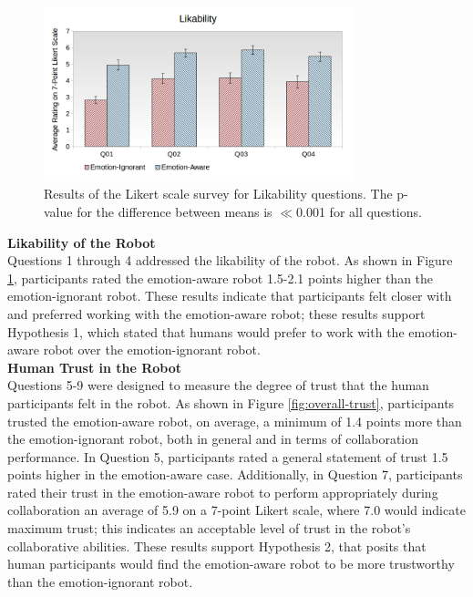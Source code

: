 \documentclass[12pt]{report}
\begin{document}
\begin{figure}[ht]
 \centering
 \includegraphics[width=0.8\textwidth]{figure/Overall-Likability.png}
 \vspace*{-5mm}
 \caption{Results of the Likert scale survey for Likability questions. The
 p-value for the difference between means is $\ll$0.001 for all questions.}
 \label{fig:overall-likability}
\end{figure}

\hspace*{-8mm} \textbf{Likability of the Robot}
\label{sec:Likability}
\\Questions 1 through 4 addressed the likability of the robot. As shown in
Figure \ref{fig:overall-likability}, participants rated the emotion-aware robot
1.5-2.1 points higher than the emotion-ignorant robot. These results
indicate that participants felt closer with and preferred working with the
emotion-aware robot; these results support Hypothesis 1, which stated that
humans would prefer to work with the emotion-aware robot over the
emotion-ignorant robot. \\

\hspace*{-8mm} \textbf{Human Trust in the Robot}
\label{sec:Trust}
\\ Questions 5-9 were designed to measure the degree of trust that the human
participants felt in the robot. As shown in Figure \ref{fig:overall-trust},
participants trusted the emotion-aware robot, on average, a minimum of 1.4
points more than the emotion-ignorant robot, both in general and in terms of
collaboration performance. In Question 5, participants rated a
general statement of trust 1.5 points higher in the emotion-aware
case. Additionally, in Question 7, participants rated their trust in the
emotion-aware robot to perform appropriately during collaboration an average of
5.9 on a 7-point Likert scale, where 7.0 would indicate maximum trust; this
indicates an acceptable level of trust in the robot's collaborative
abilities. These results support Hypothesis 2, that posits that human
participants would find the emotion-aware robot to be more trustworthy than the
emotion-ignorant robot.\\
\end{document}
